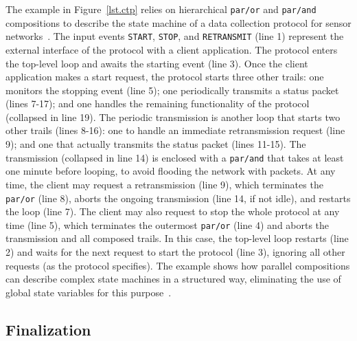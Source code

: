 \documentclass[preprint]{sigplanconf}
\newcommand{\code}[1] {{\small{\texttt{#1}}}}
\newcommand{\1}{\;}
\newcommand{\2}{\;\;}
\newcommand{\3}{\;\;\;}
\newcommand{\5}{\;\;\;\;\;}
\begin{document}
The example in Figure~\ref{lst.ctp} relies on hierarchical \code{par/or} and 
\code{par/and} compositions to describe the state machine of a data collection 
protocol for sensor networks~\cite{wsn.ctp,ceu.sensys13}.
%
The input events \code{START}, \code{STOP}, and \code{RETRANSMIT} (line 1) 
represent the external interface of the protocol with a client application.
%
The protocol enters the top-level loop and awaits the starting event (line 3).
Once the client application makes a start request, the protocol starts three 
other trails:
one monitors the stopping event (line 5);
one periodically transmits a status packet (lines 7-17);
and one handles the remaining functionality of the protocol (collapsed in line 
19).
%
The periodic transmission is another loop that starts two other trails (lines 
8-16):
one to handle an immediate retransmission request (line 9);
and one that actually transmits the status packet (lines 11-15).
%
The transmission (collapsed in line 14) is enclosed with a \code{par/and} that 
takes at least one minute before looping, to avoid flooding the network with 
packets.
%
At any time, the client may request a retransmission (line 9), which terminates 
the \code{par/or} (line 8), aborts the ongoing transmission (line 14, if not 
idle), and restarts the loop (line 7).
%
The client may also request to stop the whole protocol at any time (line 5), 
which terminates the outermost \code{par/or} (line 4) and aborts the 
transmission and all composed trails.
In this case, the top-level loop restarts (line 2) and waits for the next 
request to start the protocol (line 3), ignoring all other requests (as the 
protocol specifies).
%
The example shows how parallel compositions can describe complex state machines 
in a structured way, eliminating the use of global state variables for this 
purpose~\cite{ceu.sensys13}.

\subsection{Finalization}
\label{sec.ceu.fin}

\end{document}
